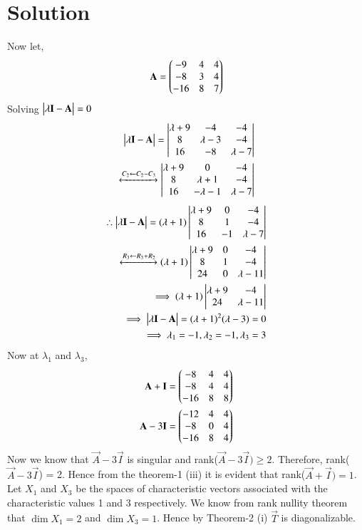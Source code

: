 \documentclass[journal,12pt,twocolumn]{IEEEtran}
\begin{document}
\section{Solution}
Now let,
\begin{align}
\mathbf{A} = \begin{pmatrix}-9&4&4\\-8&3&4\\-16&8&7\end{pmatrix}
\label{A}
\end{align} 
Solving $\begin{vmatrix}\lambda \mathbf{I} - \mathbf{A}\end{vmatrix} = 0$
\begin{align}
\begin{vmatrix}\lambda \mathbf{I} - \mathbf{A}\end{vmatrix} = \begin{vmatrix}\lambda + 9&-4&-4\\8&\lambda - 3&-4\\16&-8&\lambda - 7\end{vmatrix}\\
\xleftrightarrow[]{C_2\leftarrow C_2-C_3} \begin{vmatrix}\lambda + 9&0&-4\\8&\lambda + 1&-4\\16&-\lambda - 1&\lambda - 7\end{vmatrix}
\end{align}
\begin{align}
\therefore \begin{vmatrix}\lambda \mathbf{I} - \mathbf{A}\end{vmatrix} = (\lambda + 1)\begin{vmatrix}\lambda + 9&0&-4\\8&1&-4\\16&-1&\lambda - 7\end{vmatrix}\\
\xleftrightarrow[]{R_3\leftarrow R_3+R_2} (\lambda + 1)\begin{vmatrix}\lambda + 9&0&-4\\8&1&-4\\24&0&\lambda - 11\end{vmatrix}\\
\implies (\lambda + 1)\begin{vmatrix}\lambda + 9 & -4\\24& \lambda - 11\end{vmatrix}\\
\implies \begin{vmatrix}\lambda \mathbf{I} - \mathbf{A}\end{vmatrix} = (\lambda + 1)^{2}(\lambda - 3) = 0\\
\implies \lambda_1 = -1, \lambda_2 = -1, \lambda_3 =3
\label{lambda}
\end{align} 
Now at $\lambda_1$ and $\lambda_3$,
\begin{align}
\mathbf{A} + \mathbf{I} = \begin{pmatrix}-8&4&4\\-8&4&4\\-16&8&8\end{pmatrix}\\
\mathbf{A} - 3\mathbf{I} = \begin{pmatrix}-12&4&4\\-8&0&4\\-16&8&4\end{pmatrix}
\end{align}
Now we know that $\vec{A}-3\vec{I}$ is singular and rank($\vec{A}-3\vec{I})\geq 2.$ Therefore, rank($\vec{A}-3\vec{I}$) = 2. Hence from the theorem-1 (iii) it is evident that rank($\vec{A}+\vec{I}) = 1$. Let $X_1$ and $X_3$ be the spaces of characteristic vectors associated with the characteristic values 1 and 3 respectively. We know from rank nullity theorem that $\dim X_1 = 2$ and $\dim X_3 = 1$. Hence by Theorem-2 (i) $\vec{T}$ is diagonalizable. \\
\end{document}
